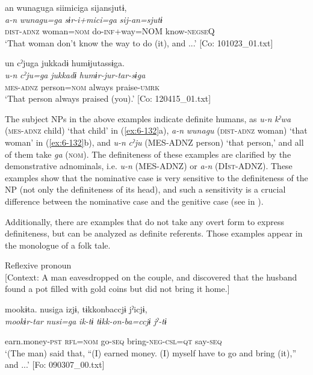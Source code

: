 \begin{table}
\begin{styleBeschriftung}
\ex {\TM}  an  wunaguga  siimiciga  sijansjutɨ,\\
\glll \textit{a-n}  \textit{wunagu=ga}  \textit{sɨr-i+mici=ga}  \textit{sij-an=sjutɨ}\\
\textsc{dist}-\textsc{adnz}  woman=\textsc{nom}  do-\textsc{inf}+way=NOM  know-\textsc{negseQ}\\
\glt ‘That woman don’t know the way to do (it), and ...’ [Co: 101023\_01.txt]
\z

\ex {\TM}  un  cˀjuga  jukkadɨ  humɨjutassɨga.\\
\glll \textit{u-n}  \textit{cˀju=ga}  \textit{jukkadɨ}  \textit{humɨr-jur-tar-sɨga}\\
\textsc{mes}-\textsc{adnz}  person=\textsc{nom}  always  praise-\textsc{umrk}\\
\glt ‘That person always praised (you).’ [Co: 120415\_01.txt]
\z

The subject NPs in the above examples indicate definite humans, as \textit{u-n} \textit{kˀwa} (\textsc{mes}-\textsc{adnz} child) ‘that child’ in (\ref{ex:6-132}a), \textit{a-n} \textit{wunagu} (\textsc{dist}-\textsc{adnz} woman) ‘that woman’ in (\ref{ex:6-132}b), and \textit{u-n} \textit{cˀju} (MES-ADNZ person) ‘that person,’ and all of them take \textit{ga} (\textsc{nom}). The definiteness of these examples are clarified by the demonstrative adnominals, i.e. \textit{u-n} (MES-ADNZ) or \textit{a-n} (DI\textsc{st}-ADNZ). These examples show that the nominative case is very sensitive to the definiteness of the NP (not only the definiteness of its head), and such a sensitivity is a crucial difference between the nominative case and the genitive case (see  in ).

  Additionally, there are examples that do not take any overt form to express definiteness, but can be analyzed as definite referents. Those examples appear in the monologue of a folk tale.

\ea\label{ex:6-133}
 \ea Reflexive pronoun\\{}
[Context: A man eavesdropped on the couple, and discovered that the husband found a pot filled with gold coins but did not bring it home.]

{\TM}
\glll mookɨta.  nusiga  izjɨ,  tɨkkonbaccjɨ  jˀicjɨ,\\

      \textit{mookɨr-tar}  \textit{nusi=ga}  \textit{ik-tɨ}  \textit{tɨkk-on-ba=ccjɨ}  \textit{jˀ-tɨ}

      earn.money-\textsc{pst}  \textsc{rfl}=\textsc{nom}  go-\textsc{seq}  bring-\textsc{neg}-\textsc{csl}=\textsc{qt}  say-\textsc{seq}\\
\glt ‘(The man) said that, “(I) earned money. (I) myself have to go and bring (it),” and ...’ [Fo: 090307\_00.txt]
\z


\end{styleBeschriftung}
\end{table}
